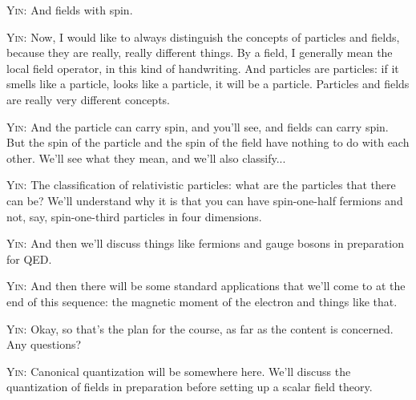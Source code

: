 
\noindent\textsc{Yin:} And fields with spin.\par

\noindent\textsc{Yin:} Now, I would like to always distinguish the concepts of particles and fields, because they are really, really different things. By a field, I generally mean the local field operator, in this kind of handwriting. And particles are particles: if it smells like a particle, looks like a particle, it will be a particle. Particles and fields are really very different concepts.\par

\noindent\textsc{Yin:} And the particle can carry spin, and you'll see, and fields can carry spin. But the spin of the particle and the spin of the field have nothing to do with each other. We'll see what they mean, and we'll also classify...\par

\noindent\textsc{Yin:} The classification of relativistic particles: what are the particles that there can be? We'll understand why it is that you can have spin-one-half fermions and not, say, spin-one-third particles in four dimensions.\par

\noindent\textsc{Yin:} And then we'll discuss things like fermions and gauge bosons in preparation for QED.\par

\noindent\textsc{Yin:} And then there will be some standard applications that we'll come to at the end of this sequence: the magnetic moment of the electron and things like that.\par

\noindent\textsc{Yin:} Okay, so that's the plan for the course, as far as the content is concerned. Any questions?\par

\noindent\textsc{Yin:} Canonical quantization will be somewhere here. We'll discuss the quantization of fields in preparation before setting up a scalar field theory.\par

